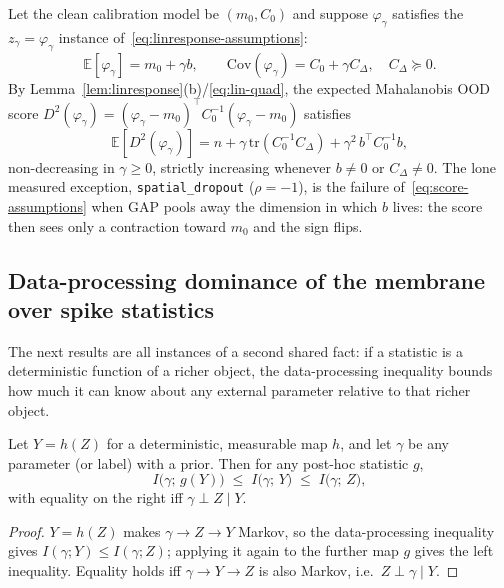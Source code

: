 ﻿\documentclass{article} %
\theoremstyle{remark}
\begin{document}
\begin{corollary}
\label{thm:score}
Let the clean calibration model be $(m_0,C_0)$ and suppose $\varphi_\gamma$ satisfies the
$z_\gamma=\varphi_\gamma$ instance of~\eqref{eq:linresponse-assumptions}:
\begin{equation}
  \mathbb{E}[\varphi_\gamma] = m_0+\gamma b,\qquad
  \mathrm{Cov}(\varphi_\gamma) = C_0+\gamma C_\Delta,\quad C_\Delta\succeq0.
  \label{eq:score-assumptions}
\end{equation}
By Lemma~\ref{lem:linresponse}(b)/\eqref{eq:lin-quad}, the expected Mahalanobis OOD score
$D^2(\varphi_\gamma)=(\varphi_\gamma-m_0)^\top C_0^{-1}(\varphi_\gamma-m_0)$ satisfies
\begin{equation}
  \mathbb{E}\!\left[D^2(\varphi_\gamma)\right]
  = n + \gamma\,\mathrm{tr}(C_0^{-1}C_\Delta) + \gamma^2\,b^\top C_0^{-1}b,
  \label{eq:score-mono}
\end{equation}
non-decreasing in $\gamma\ge0$, strictly increasing whenever $b\neq0$ or $C_\Delta\neq0$. The lone
measured exception, \texttt{spatial\_dropout} ($\rho=-1$), is the failure
of~\eqref{eq:score-assumptions} when GAP pools away the dimension in which $b$ lives: the score then
sees only a contraction toward $m_0$ and the sign flips.
\end{corollary}

\subsection{Data-processing dominance of the membrane over spike statistics}
\label{app:theory-dpi}

The next results are all instances of a second shared fact: if a statistic is a deterministic
function of a richer object, the data-processing inequality bounds how much it can know about any
external parameter relative to that richer object.

\begin{lemma}
\label{lem:dpi-general}
Let $Y=h(Z)$ for a deterministic, measurable map $h$, and let $\gamma$ be any parameter (or label)
with a prior. Then for any post-hoc statistic $g$,
\begin{equation}
  I\bigl(\gamma;\,g(Y)\bigr) \;\le\; I\bigl(\gamma;\,Y\bigr) \;\le\; I\bigl(\gamma;\,Z\bigr),
  \label{eq:dpi-general}
\end{equation}
with equality on the right iff $\gamma\perp Z\mid Y$.
\end{lemma}
\begin{proof}
$Y=h(Z)$ makes $\gamma\to Z\to Y$ Markov, so the data-processing inequality gives
$I(\gamma;Y)\le I(\gamma;Z)$; applying it again to the further map $g$ gives the left inequality.
Equality holds iff $\gamma\to Y\to Z$ is also Markov, i.e.\ $Z\perp\gamma\mid Y$.
\end{proof}
\end{document}
